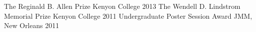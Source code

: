 \begin{cvhonors}
  \cvhonor
    {The Reginald B. Allen Prize}
    {Kenyon College}
    {2013}
  \cvhonor
    {The Wendell D. Lindstrom Memorial Prize}
    {Kenyon College}
    {2011}
  \cvhonor
    {Undergraduate Poster Session Award}
    {JMM, New Orleans}
    {2011}
\end{cvhonors}
